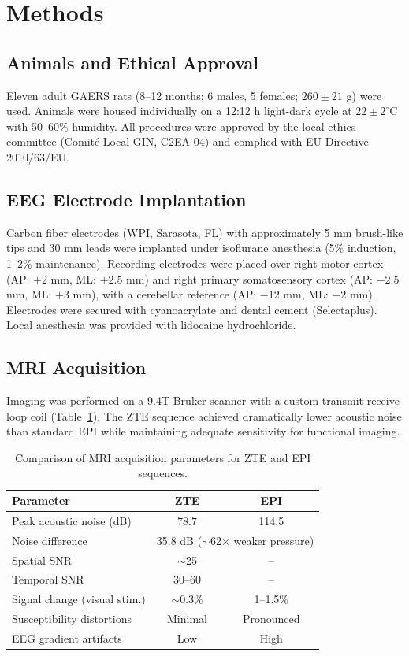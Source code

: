 \documentclass[12pt]{article}
\begin{document}
\section{Methods}

\subsection{Animals and Ethical Approval}

Eleven adult GAERS rats (8--12 months; 6 males, 5 females; $260 \pm 21$ g) were used. Animals were housed individually on a 12:12 h light-dark cycle at $22 \pm 2^\circ$C with 50--60\% humidity. All procedures were approved by the local ethics committee (Comit\'{e} Local GIN, C2EA-04) and complied with EU Directive 2010/63/EU.

\subsection{EEG Electrode Implantation}

Carbon fiber electrodes (WPI, Sarasota, FL) with approximately 5 mm brush-like tips and 30 mm leads were implanted under isoflurane anesthesia (5\% induction, 1--2\% maintenance). Recording electrodes were placed over right motor cortex (AP: $+2$ mm, ML: $+2.5$ mm) and right primary somatosensory cortex (AP: $-2.5$ mm, ML: $+3$ mm), with a cerebellar reference (AP: $-12$ mm, ML: $+2$ mm). Electrodes were secured with cyanoacrylate and dental cement (Selectaplus). Local anesthesia was provided with lidocaine hydrochloride.

\subsection{MRI Acquisition}

Imaging was performed on a 9.4T Bruker scanner with a custom transmit-receive loop coil (Table~\ref{tab:mri}). The ZTE sequence achieved dramatically lower acoustic noise than standard EPI while maintaining adequate sensitivity for functional imaging.

\begin{table}[htbp]
\centering
\caption{Comparison of MRI acquisition parameters for ZTE and EPI sequences.}
\label{tab:mri}
\begin{tabular}{lcc}
\toprule
Parameter & ZTE & EPI \\
\midrule
Peak acoustic noise (dB) & 78.7 & 114.5 \\
Noise difference & \multicolumn{2}{c}{35.8 dB ($\sim$62$\times$ weaker pressure)} \\
Spatial SNR & $\sim$25 & -- \\
Temporal SNR & 30--60 & -- \\
Signal change (visual stim.) & $\sim$0.3\% & 1--1.5\% \\
Susceptibility distortions & Minimal & Pronounced \\
EEG gradient artifacts & Low & High \\
\bottomrule
\end{tabular}
\end{table}
\end{document}
